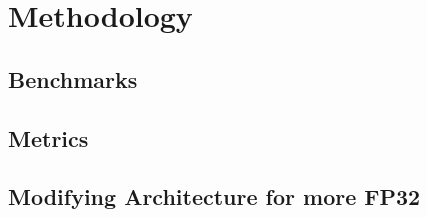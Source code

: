 \section{Methodology}

\subsection{Benchmarks}

\subsection{Metrics}

\subsection{Modifying Architecture for more FP32}
